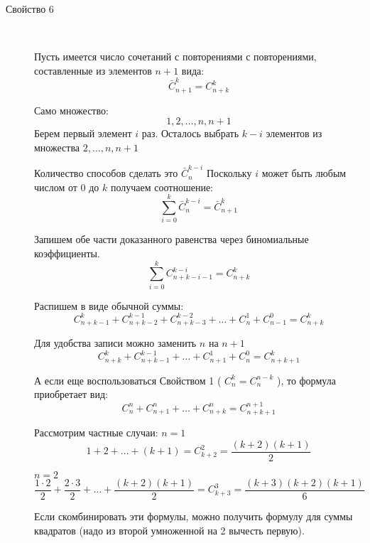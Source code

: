 \begin{description}
\item[Свойство 6]~	

Пусть имеется число сочетаний  с повторениями с повторениями, составленные из элементов $n+1$ вида: 
$$
\bar{C}_{n+1}^{k} = C_{n+k}^{k}
$$

Само множество:
$$
{1,2,\ldots,n,n + 1}
$$
Берем первый элемент $ i $ раз.
Осталось выбрать $ k-i $ элементов из множества ${2,\ldots,n,n+1}$

Количество способов сделать это $\bar{C}_{n}^{k-i} $
Поскольку $i$ может быть любым числом от 0 до $k$ получаем соотношение:
$$
\sum\limits_{i = 0}^{k} \bar{C}_{n}^{k-i} = \bar{C}_{n+1}^{k}
$$

Запишем обе части доказанного равенства через биномиальные коэффициенты.
$$
\sum\limits_{i = 0}^{k} C_{n+k-i-1}^{k-i} = C_{n+k}^{k} 
$$

Распишем в виде обычной суммы:
$$
C_{n+k-1}^{k} + C_{n+k-2}^{k-1} + C_{n+k-3}^{k-2} + \ldots + C_n^1 + C_{n-1}^0 = C_{n+k}^k
$$

Для удобства записи можно заменить $n$ на $n+1$
$$
C_{n+k}^{k} + C_{n+k-1}^{k-1} + \ldots + C_{n+1}^1 + C_{n}^0 = C_{n+k+1}^k
$$

А если еще воспользоваться Свойством 1 ( $C_n^k = C_n^{n-k}$ ),
то формула приобретает вид:
$$
C_{n}^{n} + C_{n+1}^{n} + \ldots + C_{n+k}^{n} = C_{n+k+1}^{n+1}
$$

Рассмотрим частные случаи:
$n=1$
$$
1 + 2 + \ldots + (k+1) = C_{k+2}^2 = \frac{(k+2)(k+1)}{2}
$$

$n=2$
$$
\frac{1\cdot2}{2} + \frac{2\cdot3}{2} + \ldots + \frac{(k+2)(k+1)}{2} = C_{k+3}^3 = \frac{(k+3)(k+2)(k+1)}{6}
$$

Если скомбинировать эти формулы, можно получить формулу для суммы квадратов (надо из второй умноженной на 2 вычесть первую).



 \end{description}

